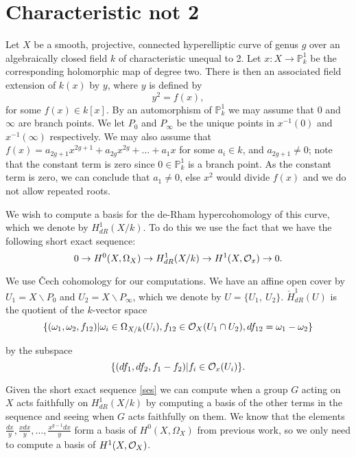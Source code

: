 \documentclass[draft, 11pt]{article} %
\title{}
\author{}
\theoremstyle{plain}
\theoremstyle{remark}
\newcommand{\cO}{{\cal O}}
\newcommand{\ra}{\rightarrow}
\begin{document}
\maketitle

\section{Characteristic not 2}


Let $X$ be a smooth, projective, connected hyperelliptic curve of genus $g$ over an algebraically closed field $k$ of characteristic unequal to 2.
Let $x:X\rightarrow \mathbb P_k^1$ be the corresponding holomorphic map of degree two.
There is then an associated field extension of $k(x)$ by $y$, where $y$ is defined by
\[
y^2 = f(x),
\]
for some $f(x)\in k[x]$.
By an automorphism of $\mathbb P_k^1$ we may assume that $0$ and $\infty$ are branch points.
We let $P_0$ and $P_\infty$ be the unique points in $x^{-1}(0)$ and $x^{-1}(\infty)$ respectively.
We may also assume that $f(x) = a_{2g+1}x^{2g+1} + a_{2g}x^{2g} + \ldots + a_1x$ for some $a_i \in k$, and $a_{2g+1} \neq 0$; note that the constant term is zero since $0\in \mathbb P_k^1$ is a branch point.
As the constant term is zero, we can conclude that $a_1 \neq 0$, else $x^2$ would divide $f(x)$ and we do not allow repeated roots.

We wish to compute a basis for the de-Rham hypercohomology of this curve, which we denote by $H^1_{dR}(X/k)$. 
To do this we use the fact that we have the following short exact sequence:
\begin{equation}\label{ses}
0 \ra H^0(X,\Omega_X) \ra H^1_{dR}(X/k) \ra H^1(X,\cO_x) \ra 0.
\end{equation}

We use \v{C}ech cohomology for our computations.
We have an affine open cover by $U_1 = X\backslash P_0$ and $U_2 = X \backslash P_\infty$, which we denote by $U = \{ U_1, \ U_2\}$.
  $\check{H}_{dR}^1(U)$ is the quotient of the $k$-vector space 
\[
\{(\omega_1, \omega_2, f_{12}) | \omega_i\in \Omega_{X/k}(U_i), f_{12}\in \cO_X(U_1 \cap U_2), df_{12} = \omega_1 - \omega_2\}
\]

by the subspace
\[
\{ (df_1, df_2, f_1-f_2)|f_i \in \cO_x(U_i)\}.
\]

Given the short exact sequence \eqref{ses} we can compute when a group $G$ acting on $X$ acts faithfully on $H^1_{dR}(X/k)$ by computing a basis of the other terms in the sequence and seeing when $G$ acts faithfully on them.
We know that the elements $\frac{dx}{y}, \frac{xdx}{y}, \ldots , \frac{x^{g-1}dx}{y}$ form a basis of $H^0(X,\Omega_X)$ from previous work, so we only need to compute a basis of $H^1(X,\cO_X)$.
\end{document}
